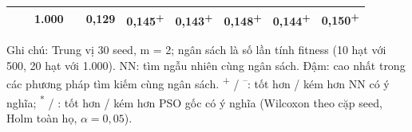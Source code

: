 \begin{table}[htbp]
\begin{tabular}{@{}lllrrrrrrr@{}}
 &  & 1.000 &  & 0,129 & 0,145\textsuperscript{+} & 0,143\textsuperscript{+} & 0,148\textsuperscript{+} & 0,144\textsuperscript{+} & \textbf{0,150\textsuperscript{+}} \\
\bottomrule
\end{tabular}
\par\smallskip\parbox{\linewidth}{\scriptsize Ghi chú: Trung vị 30 seed, m = 2; ngân sách là số lần tính fitness (10 hạt với 500, 20 hạt với 1.000). NN: tìm ngẫu nhiên cùng ngân sách. Đậm: cao nhất trong các phương pháp tìm kiếm cùng ngân sách. \textsuperscript{+} / \textsuperscript{--}: tốt hơn / kém hơn NN có ý nghĩa; \textsuperscript{*} / \textsuperscript{\dag}: tốt hơn / kém hơn PSO gốc có ý nghĩa (Wilcoxon theo cặp seed, Holm toàn họ, $\alpha = 0{,}05$).}
\end{table}
